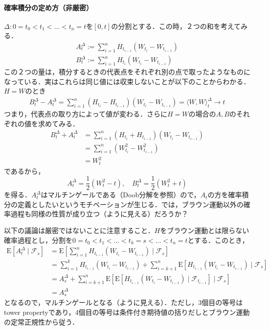 \documentclass{jsarticle}
\theoremstyle{definition}
\begin{document}
\paragraph{確率積分の定め方（非厳密）}$\Delta: 0 = t_0 < t_1 < \dots < t_n = t$を$[0, t]$の分割とする．この時，２つの和を考えてみる．
\begin{gather*}
    A_t^{\Delta} := \sum_{i=1}^{n}H_{t_{i-1}}\left(W_{t_i} - W_{t_{i-1}}\right)\\
    B_t^{\Delta} := \sum_{i=1}^{n}H_{t_{i}}\left(W_{t_i} - W_{t_{i-1}}\right)
\end{gather*}
この２つの量は，積分するときの代表点をそれぞれ別の点で取ったようなものになっている．実はこれらは同じ値には収束しないことが以下のことからわかる．$H=W$のとき
\begin{align*}
    B_t^{\Delta} - A_t^{\Delta} = \sum_{i=1}^{n}(H_{t_i} - H_{t_{i-1}})(W_{t_i} - W_{t_{i-1}}) = \langle W, W \rangle_t^{\Delta} \rightarrow t
\end{align*}
つまり，代表点の取り方によって値が変わる．さらに$H=W$の場合の$A, B$のそれぞれの値を求めてみる．
\begin{align*}
    B_t^\Delta + A_t^\Delta &= \sum_{i=1}^{n}(H_{t_i} + H_{t_{i-1}}) \left(W_{t_i} - W_{t_{i-1}}\right)\\
    &= \sum_{i=1}^n \left(W_{t_i}^2 - W_{t_{i-1}}^2\right)\\
    &= W_t^2
\end{align*}
であるから，
$$
    A_t^\Delta = \frac{1}{2}\left(W_t^2 - t\right), \quad B_t^\Delta = \frac{1}{2}\left(W_t^2 + t\right)
$$
を得る．$A_t^\Delta$はマルチンゲールである（Doob分解を参照）ので，$A_t$の方を確率積分の定義としたいというモチベーションが生じる．では，ブラウン運動以外の確率過程も同様の性質が成り立つ（ように見える）だろうか？\par

以下の議論は厳密ではないことに注意すること．$H$をブラウン運動とは限らない確率過程とし，分割を$0=t_0 < t_1 < \dots < t_k = s < \dots < t_n = t$とする．このとき，
\begin{align*}
    \mathrm{E}\left[A_t^\Delta \mid \mathscr{F}_s\right] &= \mathrm{E}\left[\sum_{i=1}^n H_{t_{i-1}}(W_{t_i} - W_{t_{i-1}})\mid \mathscr{F}_s\right]\\
    &= \sum_{i=1}^{k}H_{t_{i-1}}(W_{t_i} - W_{t_{i-1}}) + \sum_{i=k+1}^n \mathrm{E}\left[H_{t_{i-1}}(W_{t_i} - W_{t_{i-1}})\mid \mathscr{F}_s\right]\\
    &= A_s^\Delta + \sum_{i=k+1}^n\mathrm{E}\left[\mathrm{E}\left[H_{t_{i-1}}(W_{t_i} - W_{t_{i-1}}) \mid \mathscr{F}_{t_{i-1}} \right] \mid \mathscr{F}_s\right]\\
    &= A_s^\Delta
\end{align*}
となるので，マルチンゲールとなる（ように見える）．ただし，3個目の等号はtower propertyであり，4個目の等号は条件付き期待値の括りだしとブラウン運動の定常正規性から従う．\par
\end{document}
